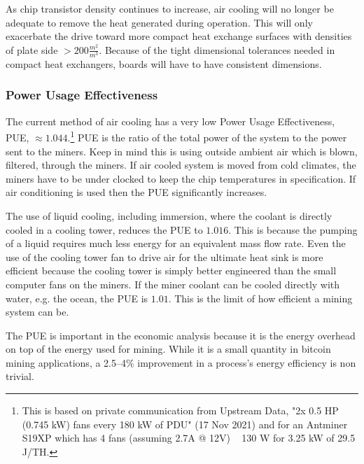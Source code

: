 \documentclass[runningheads]{llncs}
\begin{document}
As chip transistor density continues to increase, air cooling will no longer be adequate to remove the heat generated during operation.
This will only exacerbate the drive toward more compact heat exchange surfaces with densities of plate side $>200\frac{m^2}{m^3}$.
Because of the tight dimensional tolerances needed in compact heat exchangers, boards will have to have consistent dimensions.

\subsubsection{Power Usage Effectiveness}
The current method of air cooling has a very low Power Usage Effectiveness, PUE, $\approx 1.044$.\footnote{
    This is based on private communication from Upstream Data, "2x 0.5 HP (0.745 kW) fans every 180 kW of PDU" (17 Nov 2021) and for an Antminer S19XP  which has 4 fans (assuming 2.7A @ 12V) ~ 130 W for 3.25 kW of 29.5 J/TH.}
PUE is the ratio of the total power of the system to the power sent to the miners.
Keep in mind this is using outside ambient air which is blown, filtered, through the miners.
If air cooled system is moved from cold climates, the miners have to be under clocked to keep the chip temperatures in specification.
If air conditioning is used then the PUE significantly increases.

The use of liquid cooling, including immersion, where the coolant is directly cooled in a cooling tower, reduces the PUE to $1.016$.
This is because the pumping of a liquid requires much less energy for an equivalent mass flow rate.
Even the use of the cooling tower fan to drive air for the ultimate heat sink is more efficient because the cooling tower is simply better engineered than the small computer fans on the miners.
If the miner coolant can be cooled directly with water, e.g. the ocean, the PUE is $1.01$.
This is the limit of how efficient a mining system can be.

The PUE is important in the economic analysis because it is the energy overhead on top of the energy used for mining.
While it is a small quantity in bitcoin mining applications, a 2.5--4\% improvement in a process's energy efficiency is non trivial.

\end{document}
